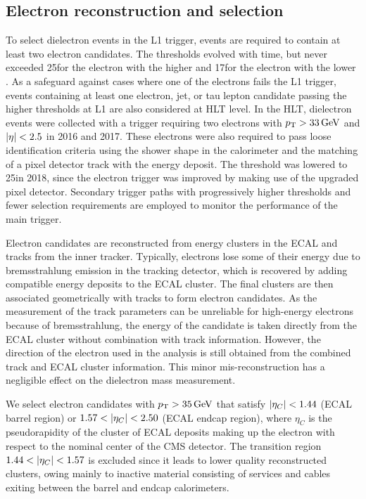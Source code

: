 \documentclass[11pt,twoside,a4paper,cmspaper,final,collab]{cms-tdr}
\begin{document}
\subsection{Electron reconstruction and selection}
To select dielectron events in the L1 trigger, events are required to contain at least two electron candidates. The \pt thresholds evolved with time, but never exceeded 25\GeV for the electron with the higher \pt and 17\GeV for the electron with the lower \pt. As a safeguard against cases where one of the electrons fails the L1 trigger, events containing at least one electron, jet, or tau lepton candidate passing the higher \pt thresholds at L1 are also considered at HLT level. In the HLT, dielectron events were collected with a trigger requiring two electrons with $p_{\mathrm{T}} > 33\,\text{Ge\hspace{-.08em}V}$ and $\lvert \eta \rvert < 2.5$ in 2016 and 2017. These electrons were also required to pass loose identification criteria using the shower shape in the calorimeter and the matching of a pixel detector track with the energy deposit. The \pt threshold was lowered to 25\GeV in 2018, since the electron trigger was improved by making use of the upgraded pixel detector. Secondary trigger paths with progressively higher \pt thresholds and fewer selection requirements are employed to monitor the performance of the main trigger. 

Electron candidates are reconstructed from energy clusters in the ECAL and tracks from the inner tracker.
Typically, electrons lose some of their energy due to bremsstrahlung emission in the tracking detector, which is recovered by adding compatible energy deposits to the ECAL cluster. The final clusters are then associated geometrically with tracks to form electron candidates. As the measurement of the track parameters can be unreliable for high-energy electrons because of bremsstrahlung, the energy of the candidate is taken directly from the ECAL cluster without combination with track information. However, the direction of the electron used in the analysis is still obtained from the combined track and ECAL cluster information. This minor mis-reconstruction has a negligible effect on the dielectron mass measurement.

We select electron candidates with  $p_{\mathrm{T}}>35\,\text{Ge\hspace{-.08em}V}$ that satisfy $\lvert \eta_C \rvert<1.44$ (ECAL barrel region) or $1.57<\lvert \eta_C \rvert<2.50$ (ECAL endcap region), where $\eta_C$ is the pseudorapidity of the cluster of ECAL deposits making up the electron with respect to the nominal center of the CMS detector. The transition region $1.44<\lvert \eta_C \rvert<1.57$ is excluded since it leads to lower quality reconstructed clusters, 
owing mainly to inactive material consisting of services and cables exiting between the barrel and endcap calorimeters.
\end{document}
